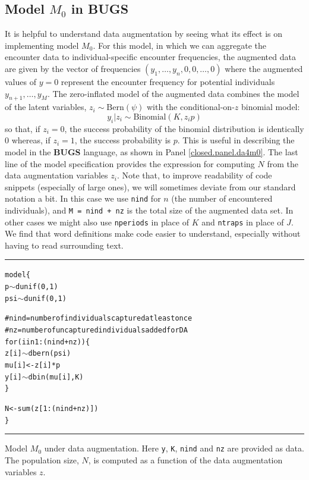 \subsection{Model $M_0$ in BUGS}

It is helpful to understand data augmentation by seeing what its
effect is on implementing model $M_0$. For this model,
 in which we can aggregate the encounter data to
individual-specific encounter frequencies, the augmented data are
given by the vector of frequencies $(y_{1}, \ldots, y_{n}, 0, 0,
\ldots, 0)$ where the augmented values of $y=0$ represent the encounter
frequency  for potential individuals $y_{n+1},\ldots,y_{M}$.
The zero-inflated model of the augmented data combines
the model of the latent variables, $z_{i} \sim \mbox{Bern}(\psi)$ with
the conditional-on-$z$ binomial model:
\[
y_{i}|z_{i}   \sim \mbox{Binomial}(K,z_{i} p)
\]
so that, if $z_{i}=0$, the success probability of the binomial
distribution is identically 0 whereas, if $z_{i}=1$, the success
probability is $p$. This is useful in describing the model in the {\bf
  BUGS} language, as shown in Panel \ref{closed.panel.da4m0}.
 The last line of the model
specification  provides the expression for computing $N$ from the
data augmentation variables $z_{i}$. Note that, to improve readability of code
snippets (especially of large ones), we will sometimes deviate from our
standard notation a bit. In this case we use \mbox{\tt nind} for $n$
(the number of encountered individuals), and \mbox{\tt M = nind + nz}
is the total size of the augmented data set. In other cases we might
also use \mbox{\tt nperiods} in place of $K$ and \mbox{\tt ntraps} in
place of $J$. We find that word definitions make code easier to
understand, especially without having to read surrounding text.

\begin{panel}[ht]
\centering
\rule[0.15in]{\textwidth}{.03in}
{\small
\begin{alltt}
model\{
p  \(\sim\) dunif(0,1)
psi \(\sim\) dunif(0,1)

# nind = number of individuals captured at least once
#   nz = number of uncaptured individuals added for DA
for(i in 1:(nind+nz))\{
    z[i]\( \sim \) dbern(psi)
   mu[i] <- z[i]*p
    y[i]\( \sim \) dbin(mu[i],K)
\}

N<-sum(z[1:(nind+nz)])
\}
\end{alltt}
}
\rule[-0.15in]{\textwidth}{.03in}
\caption{Model $M_{0}$ under data augmentation. Here \mbox{\tt y},
  \mbox{\tt K}, \mbox{\tt nind} and \mbox{\tt nz} are provided as
  data. The population size, $N$, is computed as a function of
the data augmentation variables $z$. }
\label{closed.panel.da4m0}
\end{panel}





